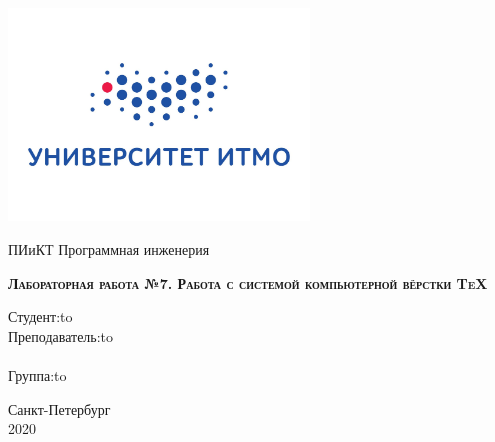 \begin{center}
\includegraphics[width=8cm]{itmo.jpg}
\end{center}

\vspace{8em}

\begin{center}
\Large ПИиКТ Программная инженерия \\ 
\end{center}

\vspace{2em}

\begin{center}
\large{
\textsc{\textbf{Лабораторная работа №7. \linebreak Работа с системой компьютерной вёрстки \TeX{}}}
}
\end{center}

\vspace{12em}



\newbox{\lbox}
\newlength{\maxl}
\setlength{\maxl}{\wd\lbox}
\hfill\parbox{11cm}{
\hspace*{5cm}\hspace*{-5cm}Студент:\hfill\hbox to\\
\hspace*{5cm}\hspace*{-5cm}Преподаватель:\hfill\hbox to\\
\\
\hspace*{5cm}\hspace*{-5cm}Группа:\hfill\hbox to\\
}


\vspace{\fill}

\begin{center}
Санкт-Петербург \\2020
\end{center}
\newpage